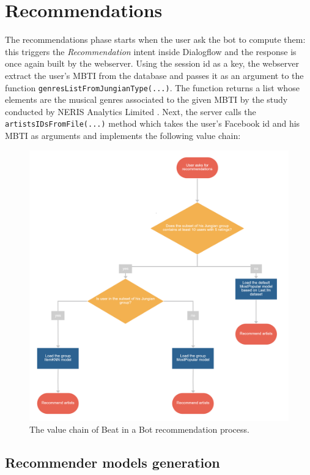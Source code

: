 \documentclass[b5paper,10pt,twoside,cucitura]{toptesi}
\begin{document}
\section{Recommendations}

The recommendations phase starts when the user ask the bot to compute them: this triggers the \textit{Recommendation} intent inside Dialogflow and the response is once again built by the webserver. Using the session id as a key, the webserver extract the user's MBTI from the database and passes it as an argument to the function \texttt{genresListFromJungianType(...)}. The function returns a list whose elements are the musical genres associated to the given MBTI by the study conducted by NERIS Analytics Limited   \citep{survey}. Next, the server calls the \texttt{artistsIDsFromFile(...)} method which takes the user's Facebook id and his MBTI as arguments and implements the following value chain:

\begin{figure}[ht]
\centering
\includegraphics[scale=0.37]{value_chain.png}
\caption{The value chain of Beat in a Bot recommendation process.}
\end{figure}

\subsection{Recommender models generation}
\end{document}
